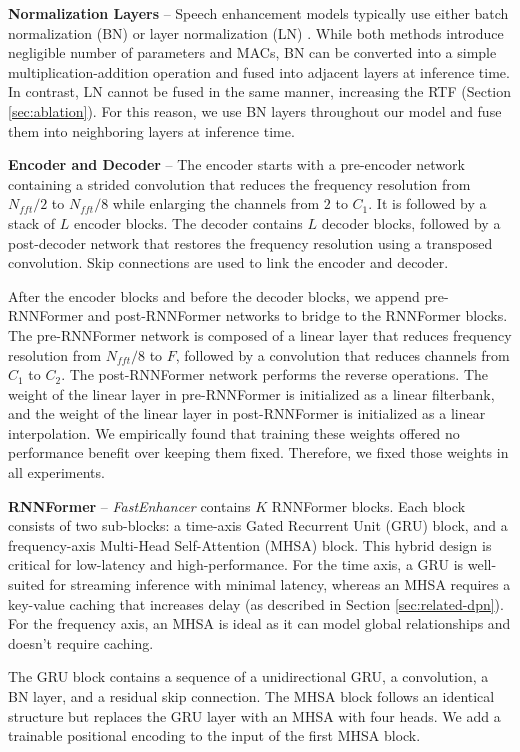 \textbf{Normalization Layers} -- Speech enhancement models typically use either batch normalization (BN) \cite{batchnorm} or layer normalization (LN) \cite{layernorm}. While both methods introduce negligible number of parameters and MACs, BN can be converted into a simple multiplication-addition operation and fused into adjacent layers at inference time. In contrast, LN cannot be fused in the same manner, increasing the RTF (Section \ref{sec:ablation}). For this reason, we use BN layers throughout our model and fuse them into neighboring layers at inference time.

\textbf{Encoder and Decoder} -- The encoder starts with a pre-encoder network containing a strided convolution that reduces the frequency resolution from $N_{fft}/2$ to $N_{fft}/8$ while enlarging the channels from $2$ to $C_1$. It is followed by a stack of $L$ encoder blocks. The decoder contains $L$ decoder blocks, followed by a post-decoder network that restores the frequency resolution using a transposed convolution. Skip connections are used to link the encoder and decoder.

After the encoder blocks and before the decoder blocks, we append pre-RNNFormer and post-RNNFormer networks to bridge to the RNNFormer blocks. The pre-RNNFormer network is composed of a linear layer that reduces frequency resolution from $N_{fft}/8$ to $F$, followed by a convolution that reduces channels from $C_1$ to $C_2$. The post-RNNFormer network performs the reverse operations. The weight of the linear layer in pre-RNNFormer is initialized as a linear filterbank, and the weight of the linear layer in post-RNNFormer is initialized as a linear interpolation. We empirically found that training these weights offered no performance benefit over keeping them fixed. Therefore, we fixed those weights in all experiments.

\textbf{RNNFormer} -- \textit{FastEnhancer} contains $K$ RNNFormer blocks. Each block consists of two sub-blocks: a time-axis Gated Recurrent Unit (GRU) \cite{gru} block, and a frequency-axis Multi-Head Self-Attention (MHSA) \cite{transformer} block. This hybrid design is critical for low-latency and high-performance. For the time axis, a GRU is well-suited for streaming inference with minimal latency, whereas an MHSA requires a key-value caching that increases delay (as described in Section \ref{sec:related-dpn}). For the frequency axis, an MHSA is ideal as it can model global relationships and doesn't require caching.

The GRU block contains a sequence of a unidirectional GRU, a convolution, a BN layer, and a residual skip connection. The MHSA block follows an identical structure but replaces the GRU layer with an MHSA with four heads. We add a trainable positional encoding to the input of the first MHSA block.